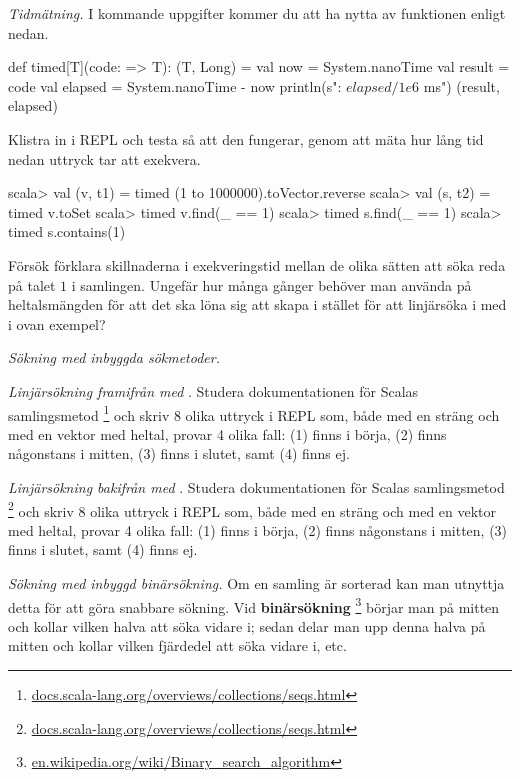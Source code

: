 \Task \label{task:timed}\emph{Tidmätning.} I kommande uppgifter kommer du att ha nytta av funktionen  enligt nedan. 
\begin{Code}
def timed[T](code: => T): (T, Long) = {
  val now = System.nanoTime
  val result = code
  val elapsed = System.nanoTime - now
  println(s"\ntime: ${elapsed / 1e6}$ ms") 
  (result, elapsed)
}
\end{Code}
\Subtask Klistra in  i REPL och testa så att den fungerar, genom att mäta hur lång tid nedan uttryck tar att exekvera. 
\begin{REPL}
scala> val (v, t1) = timed{ (1 to 1000000).toVector.reverse }
scala> val (s, t2) = timed{ v.toSet } 
scala> timed{ v.find(_ == 1) } 
scala> timed{ s.find(_ == 1) } 
scala> timed{ s.contains(1) } 
\end{REPL} 
\Subtask\Pen Försök förklara skillnaderna i exekveringstid mellan de olika sätten att söka reda på  talet $1$ i samlingen. Ungefär hur många gånger behöver man använda  på heltalsmängden  för att det ska löna sig att skapa  i stället för att linjärsöka i  med  i ovan exempel?


\Task \emph{Sökning med inbyggda sökmetoder.} 

\Subtask \emph{Linjärsökning framifrån med }. Studera dokumentationen för Scalas samlingsmetod \footnote{\href{http://docs.scala-lang.org/overviews/collections/seqs.html}{docs.scala-lang.org/overviews/collections/seqs.html}} och skriv 8 olika uttryck i REPL som, både med en sträng och med en vektor med heltal, provar 4 olika fall: (1) finns i börja, (2) finns någonstans i mitten, (3) finns i slutet, samt (4) finns ej.

\Subtask \emph{Linjärsökning bakifrån med }. Studera dokumentationen för Scalas samlingsmetod \footnote{\href{http://docs.scala-lang.org/overviews/collections/seqs.html}{docs.scala-lang.org/overviews/collections/seqs.html}} och skriv 8 olika uttryck i REPL som, både med en sträng och med en vektor med heltal, provar 4 olika fall: (1) finns i börja, (2) finns någonstans i mitten, (3) finns i slutet, samt (4) finns ej.

\Subtask \emph{Sökning med inbyggd binärsökning.} Om en samling är sorterad kan man utnyttja detta för att göra snabbare sökning. Vid \textbf{binärsökning} \footnote{\label{footnote:binarysearch}\href{https://en.wikipedia.org/wiki/Binary_search_algorithm}{en.wikipedia.org/wiki/Binary\_search\_algorithm}} börjar man på mitten och kollar vilken halva att  söka vidare i; sedan delar man upp denna halva på mitten och kollar vilken fjärdedel att söka vidare i, etc. 

